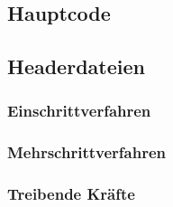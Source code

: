 \documentclass[
    oneside,
    ngerman,
    footinclude=false,
    captions=tableheading,
    DIV=12
]{scrartcl}
\begin{document}
        \subaufgabe{}

        \subaufgabe{}

        \subaufgabe{}
            

    \newpage
    \subsection*{Hauptcode}
        

    \subsection*{Headerdateien}
        \subsubsection*{Einschrittverfahren}
            

        \subsubsection*{Mehrschrittverfahren}
            

        \subsubsection*{Treibende Kräfte}
            
\end{document}
